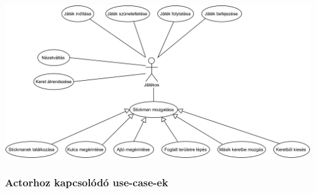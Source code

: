 		\begin{center}	
		    \includegraphics[scale=0.9]{resources/player.png}
		\end{center}        
        
        \subsubsection{Actorhoz kapcsolódó use-case-ek} %
		
